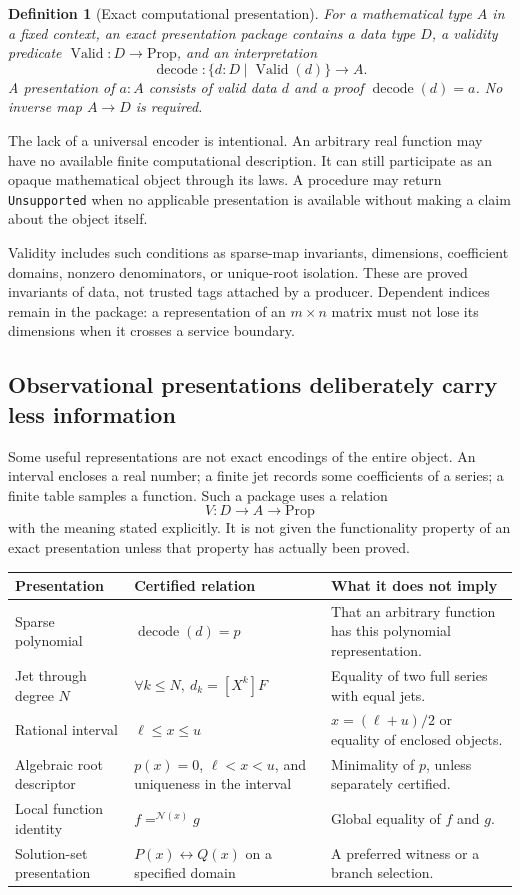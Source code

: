 \documentclass[11pt,letterpaper]{article}
\newcommand{\code}[1]{\nolinkurl{#1}}
\newcommand{\Valid}{\operatorname{Valid}}
\newtheorem{definition}[proposition]{Definition}
\numberwithin{equation}{section}
\begin{document}
\begin{definition}[Exact computational presentation]
For a mathematical type $A$ in a fixed context, an exact presentation package
contains a data type $D$, a validity predicate $\Valid:D\to\mathrm{Prop}$, and an
interpretation
\[
 \operatorname{decode}:\{d:D\mid\Valid(d)\}\longrightarrow A.
\]
A presentation of $a:A$ consists of valid data $d$ and a proof
$\operatorname{decode}(d)=a$. No inverse map $A\to D$ is required.
\end{definition}

The lack of a universal encoder is intentional. An arbitrary real function may
have no available finite computational description. It can still participate as
an opaque mathematical object through its laws. A procedure may return
\code{Unsupported} when no applicable presentation is available without making a
claim about the object itself.

Validity includes such conditions as sparse-map invariants, dimensions,
coefficient domains, nonzero denominators, or unique-root isolation. These are
proved invariants of data, not trusted tags attached by a producer. Dependent
indices remain in the package: a representation of an $m\times n$ matrix must
not lose its dimensions when it crosses a service boundary.

\subsection{Observational presentations deliberately carry less information}
Some useful representations are not exact encodings of the entire object.
An interval encloses a real number; a finite jet records some coefficients of a
series; a finite table samples a function. Such a package uses a relation
\[
 V:D\to A\to\mathrm{Prop}
\]
with the meaning stated explicitly. It is not given the functionality property
of an exact presentation unless that property has actually been proved.


\begin{tabularx}{\textwidth}{@{}P{.22\textwidth}YP{.28\textwidth}@{}}
\toprule
Presentation & Certified relation & What it does not imply\\
\midrule
Sparse polynomial & $\operatorname{decode}(d)=p$ & That an arbitrary function
has this polynomial representation.\\
Jet through degree $N$ & $\forall k\le N,\ d_k=[X^k]F$ & Equality of two full
series with equal jets.\\
Rational interval & $\ell\le x\le u$ & $x=(\ell+u)/2$ or equality of enclosed
objects.\\
Algebraic root descriptor & $p(x)=0$, $\ell<x<u$, and uniqueness in the interval
& Minimality of $p$, unless separately certified.\\
Local function identity & $f=^{\mathcal N(x)}g$ & Global equality of $f$ and $g$.\\
Solution-set presentation & $P(x)\leftrightarrow Q(x)$ on a specified domain &
A preferred witness or a branch selection.\\
\bottomrule
\end{tabularx}
\end{document}
